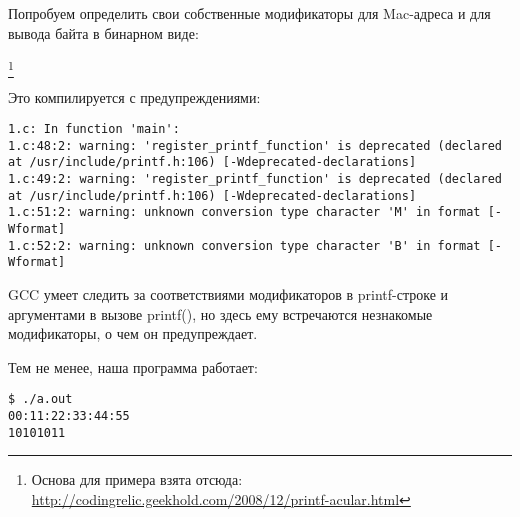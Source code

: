 Попробуем определить свои собственные модификаторы для Mac-адреса и для вывода байта в бинарном виде:


\footnote{Основа для примера взята отсюда: \url{http://codingrelic.geekhold.com/2008/12/printf-acular.html}}

Это компилируется с предупреждениями:

\begin{lstlisting}
1.c: In function 'main':
1.c:48:2: warning: 'register_printf_function' is deprecated (declared at /usr/include/printf.h:106) [-Wdeprecated-declarations]
1.c:49:2: warning: 'register_printf_function' is deprecated (declared at /usr/include/printf.h:106) [-Wdeprecated-declarations]
1.c:51:2: warning: unknown conversion type character 'M' in format [-Wformat]
1.c:52:2: warning: unknown conversion type character 'B' in format [-Wformat]
\end{lstlisting}

GCC умеет следить за соответствиями модификаторов в printf-строке и аргументами в вызове printf(), но здесь
ему встречаются незнакомые модификаторы, о чем он предупреждает.

Тем не менее, наша программа работает:

\begin{lstlisting}
$ ./a.out
00:11:22:33:44:55
10101011
\end{lstlisting}

